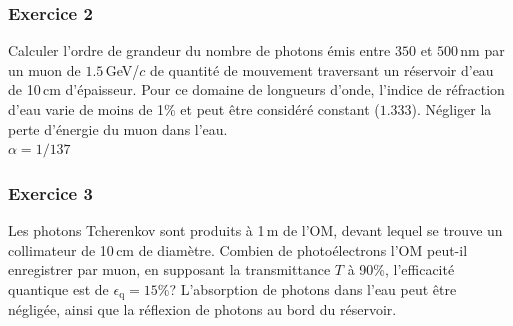 
\subsubsection{Exercice 2}
Calculer l'ordre de grandeur du nombre de photons \'emis entre $350$ et $500$\,nm par un muon de $1.5$\,GeV/$c$ de quantité de mouvement traversant un réservoir d'eau de 10\,cm d'\'epaisseur. Pour ce domaine de longueurs d’onde, l'indice de r\'efraction d'eau varie de moins de 1\% et peut \^etre consid\'er\'e constant ($1.333$). N\'egliger la perte d'\'energie du muon dans l'eau.\\ $\alpha = 1/137$


\subsubsection{Exercice 3}
Les photons Tcherenkov sont produits \`a 1\,m de l'OM, devant lequel se trouve un collimateur de 10\,cm de diam\`etre. Combien de photoélectrons l'OM peut-il enregistrer par muon, en supposant la transmittance $T$ \`a 90\%, l'efficacit\'e quantique est de $\epsilon_\mathrm{q}=15\%$? L'absorption de photons dans l'eau peut \^etre négligée, ainsi que la réflexion de photons au bord du réservoir.

